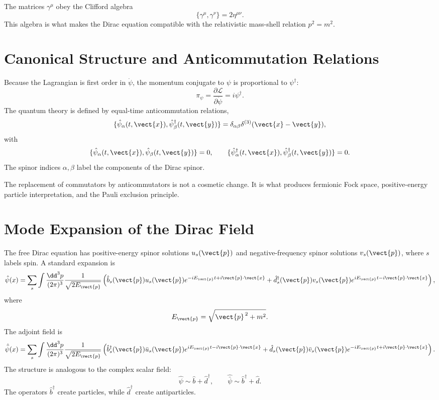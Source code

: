 The matrices \(\gamma^\mu\) obey the Clifford algebra
\[
    \{\gamma^\mu,\gamma^\nu\}=2\eta^{\mu\nu}.
\]
This algebra is what makes the Dirac equation compatible with the relativistic
mass-shell relation \(p^2=m^2\).

\section{Canonical Structure and Anticommutation Relations}

Because the Lagrangian is first order in \(\dot\psi\), the momentum conjugate to
\(\psi\) is proportional to \(\psi^\dagger\):
\[
    \pi_\psi
    = \frac{\partial\mathcal{L}}{\partial\dot\psi}
    = i\psi^\dagger.
\]
The quantum theory is defined by equal-time anticommutation relations,
\[
    \{\hat\psi_\alpha(t,\vect{x}),
      \hat\psi_\beta^\dagger(t,\vect{y})\}
    = \delta_{\alpha\beta}\delta^{(3)}(\vect{x}-\vect{y}),
\]
with
\[
    \{\hat\psi_\alpha(t,\vect{x}),
      \hat\psi_\beta(t,\vect{y})\}=0,
    \qquad
    \{\hat\psi_\alpha^\dagger(t,\vect{x}),
      \hat\psi_\beta^\dagger(t,\vect{y})\}=0.
\]
The spinor indices \(\alpha,\beta\) label the components of the Dirac spinor.

\begin{remarkbox}
The replacement of commutators by anticommutators is not a cosmetic change. It
is what produces fermionic Fock space, positive-energy particle interpretation,
and the Pauli exclusion principle.
\end{remarkbox}

\section{Mode Expansion of the Dirac Field}

The free Dirac equation has positive-energy spinor solutions \(u_s(\vect{p})\)
and negative-frequency spinor solutions \(v_s(\vect{p})\), where
\(s\) labels spin. A standard expansion is
\[
    \hat\psi(x)
    = \sum_s\int\frac{\dd^3p}{(2\pi)^3}
      \frac{1}{\sqrt{2E_{\vect{p}}}}
      \left(
          \hat b_s(\vect{p})u_s(\vect{p})e^{-iE_{\vect{p}}t+i\vect{p}\cdot\vect{x}}
          +
          \hat d_s^\dagger(\vect{p})v_s(\vect{p})e^{iE_{\vect{p}}t-i\vect{p}\cdot\vect{x}}
      \right),
\]
where
\[
    E_{\vect{p}}=\sqrt{\vect{p}^{\,2}+m^2}.
\]
The adjoint field is
\[
    \hat{\bar\psi}(x)
    = \sum_s\int\frac{\dd^3p}{(2\pi)^3}
      \frac{1}{\sqrt{2E_{\vect{p}}}}
      \left(
          \hat b_s^\dagger(\vect{p})\bar u_s(\vect{p})e^{iE_{\vect{p}}t-i\vect{p}\cdot\vect{x}}
          +
          \hat d_s(\vect{p})\bar v_s(\vect{p})e^{-iE_{\vect{p}}t+i\vect{p}\cdot\vect{x}}
      \right).
\]
The structure is analogous to the complex scalar field:
\[
    \hat\psi \sim \hat b + \hat d^\dagger,
    \qquad
    \hat{\bar\psi} \sim \hat b^\dagger + \hat d.
\]
The operators \(\hat b^\dagger\) create particles, while
\(\hat d^\dagger\) create antiparticles.

